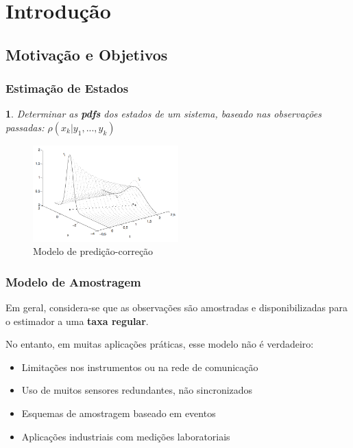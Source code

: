 \documentclass{beamer}
\newtheorem{definicao}{}
\begin{document}

\section{Introdução} 

\subsection{Motivação e Objetivos} 


\begin{frame}
	\frametitle{Estimação de Estados}
	\begin{definicao}
		Determinar as \textbf{pdfs} dos estados de um sistema, baseado nas observações passadas: $\rho(x_k | y_1,...,y_k)$ \\
	\end{definicao}
	
	\begin{figure}
		\centering
		\caption{Modelo de predição-correção}
		\includegraphics[width=0.5\textwidth]{images/pdf-propagacao.png}
	\end{figure}

\end{frame}


\begin{frame}
	\frametitle{Modelo de Amostragem}
	
	Em geral, considera-se que as observações são amostradas e disponibilizadas para o estimador a uma \textbf{taxa regular}.
	
	\vspace{0.5cm}
	
	No entanto, em muitas aplicações práticas, esse modelo não é verdadeiro:
	
	\begin{itemize}
		\item<2-> Limitações nos instrumentos ou na rede de comunicação
		\item<3-> Uso de muitos sensores redundantes, não sincronizados	
		\item<4-> Esquemas de amostragem baseado em eventos
		\item<5-> Aplicações industriais com medições laboratoriais
	\end{itemize}

\end{frame}
\end{document}
